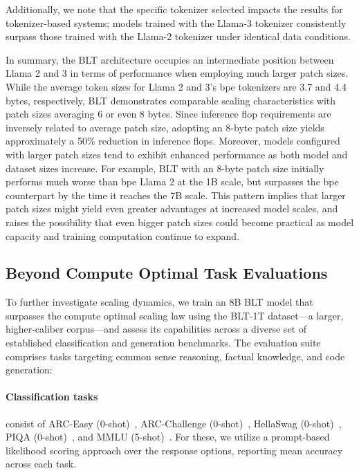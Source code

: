 Additionally, we note that the specific tokenizer selected impacts the results for tokenizer-based systems; models trained with the Llama-3 tokenizer consistently surpass those trained with the Llama-2 tokenizer under identical data conditions.

In summary, the {\textsc BLT} architecture occupies an intermediate position between Llama 2 and 3 in terms of performance when employing much larger patch sizes. While the average token sizes for Llama 2 and 3’s bpe tokenizers are 3.7 and 4.4 bytes, respectively, {\textsc BLT} demonstrates comparable scaling characteristics with patch sizes averaging 6 or even 8 bytes. Since inference flop requirements are inversely related to average patch size, adopting an 8-byte patch size yields approximately a 50\% reduction in inference flops. Moreover, models configured with larger patch sizes tend to exhibit enhanced performance as both model and dataset sizes increase. For example, {\textsc BLT} with an 8-byte patch size initially performs much worse than bpe Llama 2 at the 1B scale, but surpasses the bpe counterpart by the time it reaches the 7B scale. This pattern implies that larger patch sizes might yield even greater advantages at increased model scales, and raises the possibility that even bigger patch sizes could become practical as model capacity and training computation continue to expand.

\subsection{Beyond Compute Optimal Task Evaluations}
\label{section:evals}
To further investigate scaling dynamics, we train an 8B {\textsc BLT} model that surpasses the compute optimal scaling law using the {\textsc BLT}-1T dataset—a larger, higher-caliber corpus—and assess its capabilities across a diverse set of established classification and generation benchmarks. The evaluation suite comprises tasks targeting common sense reasoning, factual knowledge, and code generation:
\paragraph{Classification tasks} consist of ARC-Easy (0-shot)~\citep{Eval_ARC}, ARC-Challenge (0-shot)~\citep{Eval_ARC}, HellaSwag (0-shot)~\citep{Eval_hellaswag}, PIQA (0-shot)~\citep{Eval_piqa}, and MMLU (5-shot)~\citep{hendrycks2020measuring}. For these, we utilize a prompt-based likelihood scoring approach over the response options, reporting mean accuracy across each task.
